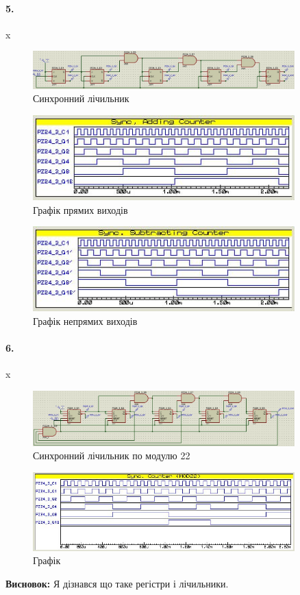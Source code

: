\documentclass[12pt]{extarticle}
\begin{document}
\paragraph{5.}x
\begin{figure}[H]
    \centering
    \includegraphics[width=0.90\textwidth]{sync_counter.jpg}
    \caption{Синхронний лічильник}
\end{figure}
\begin{figure}[H]
    \centering
    \includegraphics[width=0.90\textwidth]{sync_counter_graph_add.jpg}
    \caption{Графік прямих виходів}
\end{figure}
\begin{figure}[H]
    \centering
    \includegraphics[width=0.90\textwidth]{sync_counter_graph_sub.jpg}
    \caption{Графік непрямих виходів}
\end{figure}
\paragraph{6.}x
\begin{figure}[H]
    \centering
    \includegraphics[width=0.90\textwidth]{sync_mod_counter.jpg}
    \caption{Синхронний лічильник по модулю 22}
\end{figure}
\begin{figure}[H]
    \centering
    \includegraphics[width=0.90\textwidth]{sync_mod_counter_graph.jpg}
    \caption{Графік}
\end{figure}

\textbf{Висновок:} Я дізнався що таке регістри і лічильники.
\end{document}
